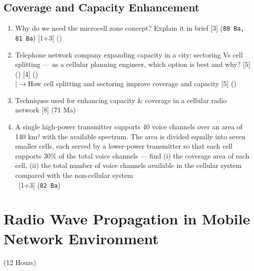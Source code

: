 \documentclass[12pt]{article}
\newcommand{\lb}{\\$\left|\rightarrow\right.$}
\newcommand{\enter}{\\\textcolor{white}{1}}
\begin{document}
  \subsection{Coverage and Capacity Enhancement}
    \begin{enumerate}[topsep=0pt, noitemsep]
      \item Why do we need the microcell zone concept? Explain it in brief \hfill [3] (\texttt{80 Ba, 81 Ba}) [1+3] ()
      \item Telephone network company expanding capacity in a city: sectoring Vs cell splitting
        --- as a cellular planning engineer, which option is best and why? \hfill [5] () [4] ()
        \lb How cell splitting and sectoring improve coverage and capacity \hfill [5] ()
      \item Techniques used for enhancing capacity \& coverage in a cellular radio network \hfill [8] (71 Ma)
      \item A single high-power transmitter supports 40 voice channels over an area of
        140 km² with the available spectrum. The area is divided equally into seven smaller
        cells, each served by a lower-power transmitter so that each cell supports 30\% of
        the total voice channels --- find (i) the coverage area of each cell, (ii) the total
        number of voice channels available in the cellular system compared with the
        non-cellular system \enter\hfill [1+3] (\texttt{82 Ba})
    \end{enumerate}

\pagebreak
\section{Radio Wave Propagation in Mobile Network Environment}
\begin{center}(12 Hours)\end{center}
\end{document}
